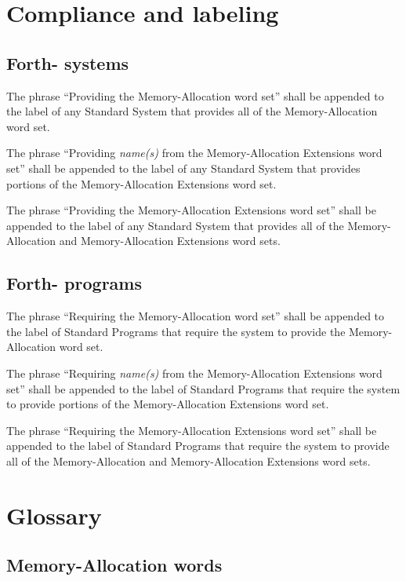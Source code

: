 \section{Compliance and labeling} %

\subsection{Forth-\snapshot{} systems} %

The phrase ``Providing the Memory-Allocation word set'' shall be
appended to the label of any Standard System that provides all of
the Memory-Allocation word set.

The phrase ``Providing \emph{name(s)} from the Memory-Allocation
Extensions word set'' shall be appended to the label of any Standard
System that provides portions of the Memory-Allocation Extensions
word set.

The phrase ``Providing the Memory-Allocation Extensions word set''
shall be appended to the label of any Standard System that provides
all of the Memory-Allocation and Memory-Allocation Extensions word
sets.

\subsection{Forth-\snapshot{} programs} %

The phrase ``Requiring the Memory-Allocation word set'' shall be
appended to the label of Standard Programs that require the system
to provide the Memory-Allocation word set.

The phrase ``Requiring \emph{name(s)} from the Memory-Allocation
Extensions word set'' shall be appended to the label of Standard
Programs that require the system to provide portions of the
Memory-Allocation Extensions word set.

The phrase ``Requiring the Memory-Allocation Extensions word set''
shall be appended to the label of Standard Programs that require
the system to provide all of the Memory-Allocation and
Memory-Al\-lo\-ca\-tion Extensions word sets.


\section{Glossary} %

\subsection{Memory-Allocation words} %

